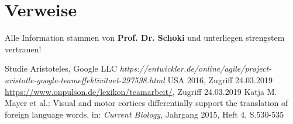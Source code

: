 \documentclass[12pt]{scrartcl}
\begin{document}
\section{Verweise}
Alle Information stammen von \textbf{Prof. Dr. Schoki} und unterliegen strengstem vertrauen! 

\renewcommand{\bibname}{Literaturverzeichnis}
\begin{thebibliography}{1}
   Studie Aristoteles, Google LLC {\em https://entwickler.de/online/agile/project-aristotle-google-teameffektivitaet-297598.html} USA 2016, Zugriff 24.03.2019
   \url{https://www.onpulson.de/lexikon/teamarbeit/}, Zugriff 24.03.2019
   Katja M. Mayer et al.: \glqq Visual and motor cortices differentially support the translation of foreign language words\grqq, in: \textit{Current Biology}, Jahrgang 2015, Heft 4, S.530-535
\end{thebibliography}
\end{document}
